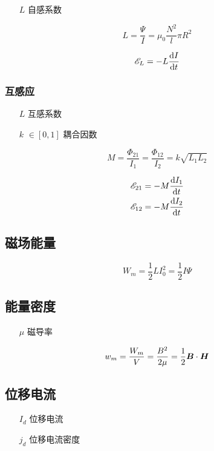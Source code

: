 \documentclass{article}
\begin{document}
\begin{enumerate}
    \item [$L$] 自感系数
\end{enumerate}

\[L=\frac{\Psi}I=\mu_0\frac{N^2}l\pi R^2\]

\[\mathscr E_L=-L\frac{\mathrm d I}{\mathrm d t}\]

\subsubsection{互感应}

\begin{enumerate}
    \item [$L$] 互感系数
    \item [$k$] $\in\left[0,1\right]$ 耦合因数
\end{enumerate}

\[M=\frac{\Phi_{21}}{I_1}=\frac{\Phi_{12}}{I_2}=k\sqrt{L_1L_2}\]

\[\begin{aligned}
        \mathscr E_{21} & =-M\frac{\mathrm d I_1}{\mathrm d t} \\
        \mathscr E_{12} & =-M\frac{\mathrm d I_2}{\mathrm d t}
    \end{aligned}\]

\subsection{磁场能量}

\[W_m=\frac12LI_0^2=\frac12I\Psi\]

\subsection{能量密度}

\begin{enumerate}
    \item [$\mu$] 磁导率
\end{enumerate}

\[w_m=\frac{W_m}V=\frac{B^2}{2\mu}=\frac12\boldsymbol{B}\cdot\boldsymbol{H}\]

\subsection{位移电流}

\begin{enumerate}
    \item [$I_d$] 位移电流
    \item [$j_d$] 位移电流密度
\end{enumerate}
\end{document}
